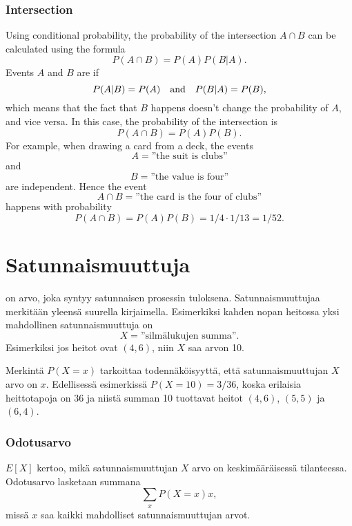 \subsubsection{Intersection}


Using conditional probability,
the probability of the intersection
$A \cap B$ can be calculated using the formula
\[P(A \cap B)=P(A)P(B|A).\]
Events $A$ and $B$ are  if
\[P(A|B)=P(A) \hspace{10px}\textrm{and}\hspace{10px} P(B|A)=P(B),\]
which means that the fact that $B$ happens doesn't
change the probability of $A$, and vice versa.
In this case, the probability of the intersection is
\[P(A \cap B)=P(A)P(B).\]
For example, when drawing a card from a deck, the events
\[A = \textrm{''the suit is clubs''}\]
and
\[B = \textrm{''the value is four''}\]
are independent. Hence the event
\[A \cap B = \textrm{''the card is the four of clubs''}\]
happens with probability
\[P(A \cap B)=P(A)P(B)=1/4 \cdot 1/13 = 1/52.\]

\section{Satunnaismuuttuja}


 on arvo, joka syntyy satunnaisen
prosessin tuloksena.
Satunnaismuuttujaa merkitään yleensä
suurella kirjaimella.
Esimerkiksi kahden nopan heitossa yksi mahdollinen
satunnaismuuttuja on
\[X=\textrm{''silmälukujen summa''}.\]
Esimerkiksi jos heitot ovat $(4,6)$,
niin $X$ saa arvon 10.

Merkintä $P(X=x)$ tarkoittaa todennäköisyyttä,
että satunnaismuuttujan $X$ arvo on $x$.
Edellisessä esimerkissä $P(X=10)=3/36$,
koska erilaisia heittotapoja on 36
ja niistä summan 10 tuottavat heitot
$(4,6)$, $(5,5)$ ja $(6,4)$.

\subsubsection{Odotusarvo}


 $E[X]$ kertoo, mikä satunnaismuuttujan $X$
arvo on keskimääräisessä tilanteessa.
Odotusarvo lasketaan summana
\[\sum_x P(X=x)x,\]
missä $x$ saa kaikki mahdolliset satunnaismuuttujan arvot.

